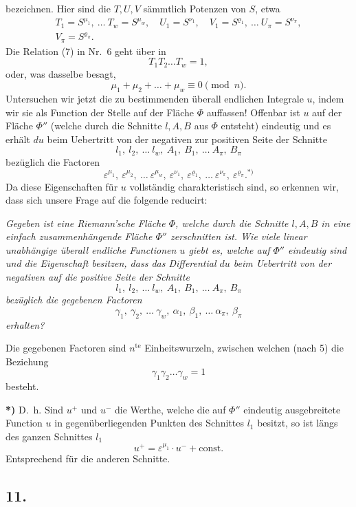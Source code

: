 \documentclass{article}
\begin{document}
bezeichnen. Hier sind die $T, U, V$ sämmtlich Potenzen von $S$, etwa
\[
\begin{gathered}
T_1 = S^{\mu_1}, \ \dots \ T_w = S^{\mu_w}, \quad U_1 = S^{\nu_1}, \quad V_1 = S^{\varrho_1}, \ \dots \ U_\pi = S^{\nu_\pi}, \\
V_\pi = S^{\varrho_\pi}.
\end{gathered}
\tag{4}
\]
Die Relation (7) in Nr.~6 geht über in
\[
T_1 T_2 \dots T_w = 1,
\]
oder, was dasselbe besagt,
\[
\mu_1 + \mu_2 + \dots + \mu_w \equiv 0 \pmod n.
\tag{5}
\]
Untersuchen wir jetzt die zu bestimmenden überall endlichen Integrale $u$, indem wir sie als Function der Stelle auf der Fläche $\Phi$ auffassen! Offenbar ist $u$ auf der Fläche $\Phi''$ (welche durch die Schnitte $l, A, B$ aus $\Phi$ entsteht) eindeutig und es erhält $du$ beim Uebertritt von der negativen zur positiven Seite der Schnitte
\[
l_1, \ l_2, \ \dots \ l_w, \ A_1, \ B_1, \ \dots \ A_\pi, \ B_\pi
\]
bezüglich die Factoren
\[
\varepsilon^{\mu_1}, \ \varepsilon^{\mu_2}, \ \dots \ \varepsilon^{\mu_w}, \ \varepsilon^{\nu_1}, \ \varepsilon^{\varrho_1}, \ \dots \ \varepsilon^{\nu_\pi}, \ \varepsilon^{\varrho_\pi}.{}^{*)}
\]
Da diese Eigenschaften für $u$ vollständig charakteristisch sind, so erkennen wir, dass sich unsere Frage auf die folgende reducirt:

\emph{Gegeben ist eine Riemann'sche Fläche $\Phi$, welche durch die Schnitte $l, A, B$ in eine einfach zusammenhängende Fläche $\Phi''$ zerschnitten ist. Wie viele linear unabhängige überall endliche Functionen $u$ giebt es, welche auf $\Phi''$ eindeutig sind und die Eigenschaft besitzen, dass das Differential $du$ beim Uebertritt von der negativen auf die positive Seite der Schnitte}
\[
l_1, \ l_2, \ \dots \ l_w, \ A_1, \ B_1, \ \dots \ A_\pi, \ B_\pi
\]
\emph{bezüglich die gegebenen Factoren}
\[
\gamma_1, \ \gamma_2, \ \dots \ \gamma_w, \ \alpha_1, \ \beta_1, \ \dots \ \alpha_\pi, \ \beta_\pi
\]
\emph{erhalten?}

Die gegebenen Factoren sind $n^{\text{te}}$ Einheitswurzeln, zwischen welchen (nach 5) die Beziehung
\[
\gamma_1 \gamma_2 \dots \gamma_w = 1
\tag{6}
\]
besteht.

\textbf{*)} D.~h. Sind $u^+$ und $u^-$ die Werthe, welche die auf $\Phi''$ eindeutig ausgebreitete Function $u$ in gegenüberliegenden Punkten des Schnittes $l_1$ besitzt, so ist längs des ganzen Schnittes $l_1$
\[
u^+ = \varepsilon^{\mu_1} \cdot u^- + \text{const.}
\]
Entsprechend für die anderen Schnitte.

\subsection*{11.}
\end{document}
